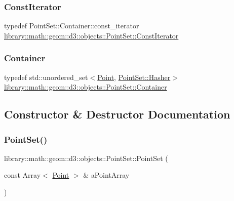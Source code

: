 \subsubsection{\texorpdfstring{Const\+Iterator}{ConstIterator}}
{\footnotesize\ttfamily typedef Point\+Set\+::\+Container\+::const\+\_\+iterator \hyperlink{classlibrary_1_1math_1_1geom_1_1d3_1_1objects_1_1_point_set_a7b7fade95484b653ec27ad082ffc8064}{library\+::math\+::geom\+::d3\+::objects\+::\+Point\+Set\+::\+Const\+Iterator}}

\mbox{\label{classlibrary_1_1math_1_1geom_1_1d3_1_1objects_1_1_point_set_ac1aed08551a4cc9556b4b49f88ae35d4}} 
\subsubsection{\texorpdfstring{Container}{Container}}
{\footnotesize\ttfamily typedef std\+::unordered\+\_\+set$<$\hyperlink{classlibrary_1_1math_1_1geom_1_1d3_1_1objects_1_1_point}{Point}, \hyperlink{structlibrary_1_1math_1_1geom_1_1d3_1_1objects_1_1_point_set_1_1_hasher}{Point\+Set\+::\+Hasher}$>$ \hyperlink{classlibrary_1_1math_1_1geom_1_1d3_1_1objects_1_1_point_set_ac1aed08551a4cc9556b4b49f88ae35d4}{library\+::math\+::geom\+::d3\+::objects\+::\+Point\+Set\+::\+Container}}



\subsection{Constructor \& Destructor Documentation}
\mbox{\label{classlibrary_1_1math_1_1geom_1_1d3_1_1objects_1_1_point_set_a6f9624b8c6bb3aa9d57a35a6fa2e0fba}} 
\subsubsection{\texorpdfstring{Point\+Set()}{PointSet()}}
{\footnotesize\ttfamily library\+::math\+::geom\+::d3\+::objects\+::\+Point\+Set\+::\+Point\+Set (\begin{DoxyParamCaption}\item[{const Array$<$ \hyperlink{classlibrary_1_1math_1_1geom_1_1d3_1_1objects_1_1_point}{Point} $>$ \&}]{a\+Point\+Array }\end{DoxyParamCaption})}



